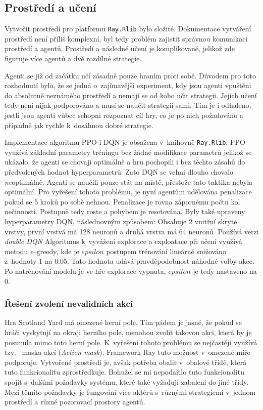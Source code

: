 \subsection{Prostředí a učení}\label{subsec:prostredi}

Vytvořit prostředí pro platformu \texttt{Ray.Rlib} bylo složité.
Dokumentace vytváření prostředí není příliš komplexní, byl tedy problém zajistit správnou komunikaci prostředí a agentů.
Prostředí a následné učení je komplikované, jelikož zde figuruje více agentů a dvě rozdílné strategie.

Agenti se již od začátku učí zásadně pouze hraním proti sobě.
Důvodem pro toto rozhodnutí bylo, že se jedná o~zajímavější experiment, kdy jsou agenti vpuštěni do absolutně neznámého prostředí a nemají se od koho učit strategii.
Jejich učení tedy není nijak podporováno a musí se naučit strategii sami.
Tím je i odhaleno, jestli jsou agenti vůbec schopni rozpoznat cíl hry, co je po nich požadováno a případně jak rychle k~dosáhnou dobré strategie.

Implementace algoritmu PPO i DQN je obsažena v~knihovně \texttt{Ray.Rlib}.
PPO využívá základní parametry tréningu bez žádné modifikace parametrů jelikož se ukázalo, že agenti se chovají optimálně a hru pochopili i bez těchto zásahů do předvolených hodnot hyperparametrů.
Zato DQN se velmi dlouho chovalo \emph{ne}optimálně.
Agenti se naučili pouze stát na místě, přestože tato taktika nebyla optimální.
Pro vyřešení tohoto problému, je nyní agentům udělována penalizace pokud se 5 kroků po sobě nehnou.
Penalizace je rovna zápornému počtu kol nečinnosti.
Postupně tedy roste a pohybem je resetována.
Byly také upraveny hyperparametry DQN, následnovným způsobem:
Obsahuje 2 vnitřní skryté vrstvy, první vrstvá má 128 neuronů a druhá vrstva má 64 neuronů.
Používá verzi \emph{double DQN}
Algoritmus k~vyvážení explorace a exploatace při učení využívá metodu $\epsilon$--greedy, kde je $epsilon$ postupem trénování lineárně snižováno z~hodnoty 1 na 0.05.
Tato hodnota udává pravděpodobnost náhodné volby akce.
Po natrénování modelu je ve hře explorace vypnuta, $epsilon$ je tedy nastaveno na 0.

\subsubsection*{Řešení zvolení nevalidních akcí}

Hra Scotland Yard má omezené herní pole.
Tím pádem je jasné, že pokud se hráči vyskytují na okraji herního pole, nemohou zvolit takovou akci, která by je posunula mimo toto herní pole.
K~vyřešení tohoto problému se nejčastěji využívá tzv.~ maska akcí (\emph{Action mask}).
Framework Ray tuto možnost v~omezené míře podporuje.
Vytvořené prostředí je, avšak potřeba obalit v~obalové třídě, která tuto funkcionalitu zprostředkuje.
Bohužel se mi nepodařilo tuto funkcionalitu spojit s~dalšími požadavky systému, které také vyžadují zabalení do jiné třídy.
Mezi těmito požadavky je fungování více aktérů s~různými strategiemi v~jednom prostředí a různé pozorovací prostory agentů.

